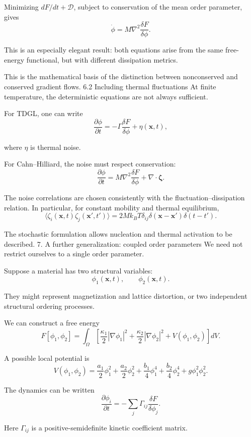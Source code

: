 Minimizing \(dF/dt+\mathcal D\), subject to conservation of the mean order parameter, gives
\[
\boxed{
\dot\phi=M\nabla^2\frac{\delta F}{\delta\phi}.
}
\]

This is an especially elegant result: both equations arise from the same free-energy functional, but with different dissipation metrics.

This is the mathematical basis of the distinction between nonconserved and conserved gradient flows.
6.2 Including thermal fluctuations
At finite temperature, the deterministic equations are not always sufficient.

For TDGL, one can write
\[
\frac{\partial\phi}{\partial t}
=
-\Gamma\frac{\delta F}{\delta\phi}
+\eta(\mathbf x,t),
\]

where \(\eta\) is thermal noise.

For Cahn–Hilliard, the noise must respect conservation:
\[
\frac{\partial\phi}{\partial t}
=
M\nabla^2\frac{\delta F}{\delta\phi}
+\nabla\cdot\boldsymbol\zeta.
\]

The noise correlations are chosen consistently with the fluctuation–dissipation relation. In particular, for constant mobility and thermal equilibrium,
\[
\langle\zeta_i(\mathbf x,t)
\zeta_j(\mathbf x',t')\rangle
=
2Mk_BT\delta_{ij}
\delta(\mathbf x-\mathbf x')
\delta(t-t').
\]

The stochastic formulation allows nucleation and thermal activation to be described.
7. A further generalization: coupled order parameters
We need not restrict ourselves to a single order parameter.

Suppose a material has two structural variables:
\[
\phi_1(\mathbf x,t),\qquad
\phi_2(\mathbf x,t).
\]

They might represent magnetization and lattice distortion, or two independent structural ordering processes.

We can construct a free energy
\[
F[\phi_1,\phi_2]
=
\int_\Omega
\left[
\frac{\kappa_1}{2}|\nabla\phi_1|^2
+\frac{\kappa_2}{2}|\nabla\phi_2|^2
+V(\phi_1,\phi_2)
\right]dV.
\]

A possible local potential is
\[
V(\phi_1,\phi_2)
=
\frac{a_1}{2}\phi_1^2
+\frac{a_2}{2}\phi_2^2
+\frac{b_1}{4}\phi_1^4
+\frac{b_2}{4}\phi_2^4
+g\phi_1^2\phi_2^2.
\]

The dynamics can be written
\[
\frac{\partial\phi_i}{\partial t}
=
-\sum_j\Gamma_{ij}
\frac{\delta F}{\delta\phi_j}.
\]

Here \(\Gamma_{ij}\) is a positive-semidefinite kinetic coefficient matrix.

